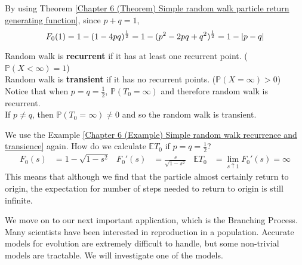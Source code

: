 \documentclass{huhtakm-template-book}
\newcommand{\prob}{\mathbb{P}}
\newcommand{\expect}{\mathbb{E}}
\begin{document}
\begin{proofing}
	By using Theorem \ref{Chapter 6 (Theorem) Simple random walk particle return generating function}, since $p+q=1$,
	\begin{equation*}
		F_{0}(1)=1-(1-4pq)^{\frac{1}{2}}=1-(p^{2}-2pq+q^{2})^{\frac{1}{2}}=1-\left|{p-q}\right|
	\end{equation*}
\end{proofing}
\begin{rem}
	Random walk is \textbf{recurrent} if it has at least one recurrent point. ($\prob(X<\infty)=1$)\\
	Random walk is \textbf{transient} if it has no recurrent points. ($\prob(X=\infty)>0$)\\
	Notice that when $p=q=\frac{1}{2}$, $\prob(T_{0}=\infty)$ and therefore random walk is recurrent.\\
	If $p\neq q$, then $\prob(T_{0}=\infty)\neq 0$ and so the random walk is transient.
\end{rem}
\begin{eg}
	We use the Example \ref{Chapter 6 (Example) Simple random walk recurrence and transience} again. How do we calculate $\expect T_{0}$ if $p=q=\frac{1}{2}$?
	\begin{align*}
		F_{0}(s)&=1-\sqrt{1-s^{2}} & F_{0}'(s)&=\frac{s}{\sqrt{1-s^{2}}} & \expect T_{0}&=\lim_{s\uparrow 1}F_{0}'(s)=\infty
	\end{align*}
	This means that although we find that the particle almost certainly return to origin, the expectation for number of steps needed to return to origin is still infinite.
\end{eg}
We move on to our next important application, which is the Branching Process.\\
Many scientists have been interested in reproduction in a population. Accurate models for evolution are extremely difficult to handle, but some non-trivial models are tractable. We will investigate one of the models.
\end{document}
